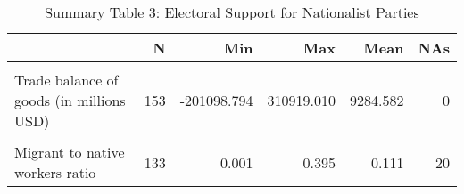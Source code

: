 \begin{table}[!h]
\centering
\caption{Summary Table 3: Electoral Support for Nationalist Parties}
\centering
\begin{tabular}[t]{lrrrrr}
\toprule
  & N & Min & Max & Mean & NAs\\
\midrule
\cellcolor{gray!10}{Nationalism Vote Share} & \cellcolor{gray!10}{153} & \cellcolor{gray!10}{0.000} & \cellcolor{gray!10}{0.502} & \cellcolor{gray!10}{0.129} & \cellcolor{gray!10}{0}\\
Trade balance of goods (in millions USD) & 153 & -201098.794 & 310919.010 & 9284.582 & 0\\
\cellcolor{gray!10}{FDI net balance (in millions USD)} & \cellcolor{gray!10}{151} & \cellcolor{gray!10}{-162613.809} & \cellcolor{gray!10}{57007.198} & \cellcolor{gray!10}{-3233.734} & \cellcolor{gray!10}{2}\\
Migrant to native workers ratio & 133 & 0.001 & 0.395 & 0.111 & 20\\
\bottomrule
\end{tabular}
\end{table}
